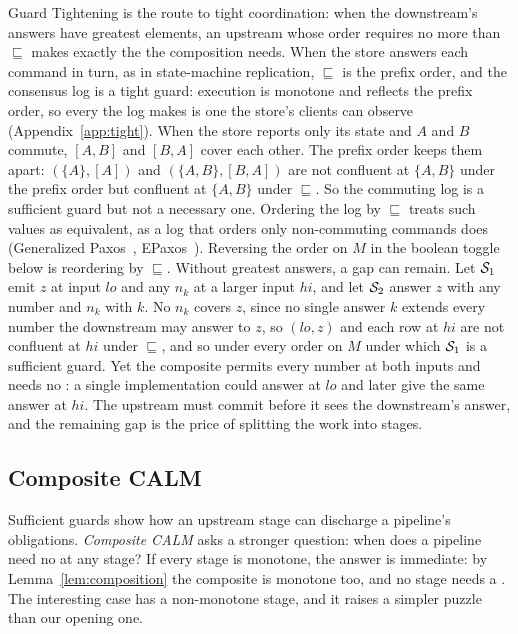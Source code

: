 Guard Tightening is the route to tight coordination: when the
downstream's answers have greatest elements, an upstream whose order requires
no more \commitments than $\sqsubseteq$ makes exactly the \commitments the
composition needs.  When the store answers each command in turn, as in
state-machine replication, $\sqsubseteq$ is the prefix order, and the
consensus log is a tight guard: execution is monotone and reflects the prefix
order, so every \commitment the log makes is one the store's clients can
observe (Appendix~\ref{app:tight}).  When the store reports only its state and
$A$ and $B$ commute, $[A,B]$ and $[B,A]$ cover each other.  The prefix order
keeps them apart: $(\{A\},[A])$ and
$(\{A,B\},[B,A])$ are not confluent at $\{A,B\}$ under the prefix order but
confluent at $\{A,B\}$ under $\sqsubseteq$.  So the commuting log is a
sufficient guard but not a necessary one.  Ordering the log by $\sqsubseteq$
treats such values as equivalent, as a log that orders only non-commuting
commands does (Generalized Paxos~\cite{lamport2005generalized},
EPaxos~\cite{moraru2013epaxos}).  Reversing the order
on $M$ in the boolean toggle below is reordering by $\sqsubseteq$.  Without
greatest answers, a gap can remain.  Let $\mathcal{S}_1$ emit $z$ at input
$\mathit{lo}$ and any $n_k$ at a larger input $\mathit{hi}$, and let $\mathcal{S}_2$
answer $z$ with any number and $n_k$ with $k$.  No $n_k$ covers $z$, since no single
answer $k$ extends every number the downstream may answer to $z$, so $(\mathit{lo},z)$ and each row at $\mathit{hi}$ are not confluent at
$\mathit{hi}$ under $\sqsubseteq$, and so under every order on $M$ under which
$\mathcal{S}_1$ is a sufficient guard.  Yet the composite permits every number at both
inputs and needs no \commitment: a single implementation could answer at
$\mathit{lo}$ and later give the same answer at $\mathit{hi}$.  The upstream
must commit before it sees the downstream's answer, and the remaining gap is
the price of splitting the work into stages.

\subsection{Composite CALM}
\label{sec:composite-calm}

Sufficient guards show how an upstream
stage can discharge a pipeline's \commitment obligations.
\emph{Composite CALM} asks a stronger question: when does a pipeline need no
\commitment at any stage?  If every stage is monotone, the answer is immediate:
by Lemma~\ref{lem:composition} the composite is monotone too, and no stage needs
a \commitment.  The interesting case has a non-monotone stage, and it raises a
simpler puzzle than our opening one.

